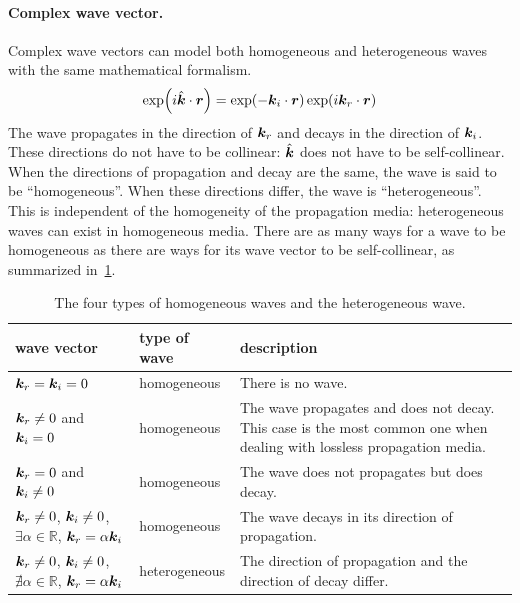 \paragraph{Complex wave vector.}
\label{sec:complex_wave_vector}
Complex wave vectors can model both homogeneous and heterogeneous waves with the same mathematical formalism.
\begin{equation}
    \exp \left( i \vectcp{k} \cdot \vect{r} \right)
    =
    \exp \left( - \vect{k}_\im \cdot \vect{r} \right)
    \exp \left( i \vect{k}_\re \cdot \vect{r} \right)
\end{equation}
The wave propagates in the direction of $\bm{k}_r$
and decays in the direction of $\bm{k}_i$.
These directions do not have to be collinear: $\hat{\bm{k}}$ does not have to be self-collinear.
When the directions of propagation and decay are the same, the wave is said to be ``homogeneous''.
When these directions differ, the wave is ``heterogeneous''.
This is independent of the homogeneity of the propagation media: heterogeneous waves can exist in homogeneous media.
There are as many ways for a wave to be homogeneous as there are ways for its wave vector to be self-collinear, as summarized in~\cref{tab:types_homo_hetero_waves}.
\begin{table}
    \centering
    \begin{tabularx}{\textwidth}{p{3cm}lX}
        \toprule
        wave vector & type of wave & description\\
        \midrule
                $\bm{k}_r = \bm{k}_i = 0$
                &
                homogeneous
                &
                There is no wave.
            \\
                $\bm{k}_r \neq 0$ and $\bm{k}_i = 0$
                &
                homogeneous
                &
                The wave propagates and does not decay.
                This case is the most common one when dealing with
                lossless propagation media.
            \\
                $\bm{k}_r = 0$ and $\bm{k}_i \neq 0$
                &
                homogeneous
                &
                The wave does not propagates but does decay.
            \\
                $\bm{k}_r \neq 0$, $\bm{k}_i \neq 0$, $\exists \alpha \in \mathbb{R}$, $\bm{k}_r = \alpha \bm{k}_i$
                &
                homogeneous
                &
                The wave decays in its direction of propagation.
            \\
                $\bm{k}_r \neq 0$, $\bm{k}_i \neq 0$, $\nexists \alpha \in \mathbb{R}$, $\bm{k}_r = \alpha \bm{k}_i$
                &
                heterogeneous
                &
                The direction of propagation and the direction of decay differ.
            \\
        \bottomrule
    \end{tabularx}
    \caption{The four types of homogeneous waves and the heterogeneous wave.}
    \label{tab:types_homo_hetero_waves}
\end{table}

